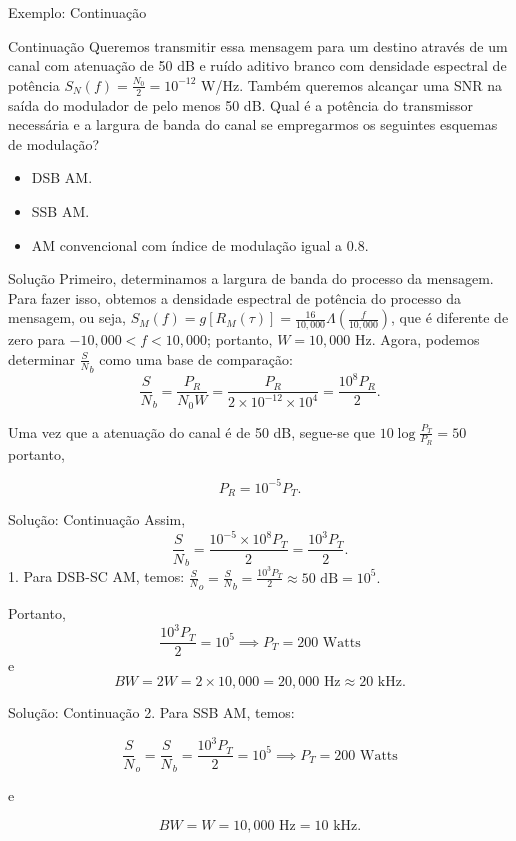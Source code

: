 \documentclass[aspectratio=169,dvipsnames]{beamer}
\begin{document}
\begin{frame}{Exemplo: Continuação}
\begin{block}{Continuação}
        Queremos transmitir essa mensagem para um destino através de um canal com atenuação de 50 dB e ruído aditivo branco com densidade espectral de potência \( S_N(f) = \frac{N_0}{2} = 10^{-12} \) W/Hz. Também queremos alcançar uma SNR na saída do modulador de pelo menos 50 dB. Qual é a potência do transmissor necessária e a largura de banda do canal se empregarmos os seguintes esquemas de modulação?

        \begin{itemize}
    \item DSB AM.
    \item SSB AM.
    \item AM convencional com índice de modulação igual a 0.8.
\end{itemize}

\end{block}

\end{frame}

\begin{frame}{Solução}
Primeiro, determinamos a largura de banda do processo da mensagem. Para fazer isso, obtemos a densidade espectral de potência do processo da mensagem, ou seja, $S_M(f) = g[R_M(\tau)] = \frac{16}{10,000} \Lambda \left( \frac{f}{10,000} \right)$, que é diferente de zero para \( -10,000 < f < 10,000 \); portanto, \( W = 10,000 \) Hz. Agora, podemos determinar \( \frac{S}{N}_b \) como uma base de comparação:
\[
\frac{S}{N}_b = \frac{P_R}{N_0W} = \frac{P_R}{2 \times 10^{-12} \times 10^4} = \frac{10^8 P_R}{2}.
\]

Uma vez que a atenuação do canal é de 50 dB, segue-se que $10 \log \frac{P_T}{P_R} = 50$
portanto,

\[
P_R = 10^{-5} P_T.
\]
\end{frame}

\begin{frame}{Solução: Continuação}
Assim,
\[
\frac{S}{N}_b = \frac{10^{-5} \times 10^8 P_T}{2} = \frac{10^3 P_T}{2}.
\]
1. Para DSB-SC AM, temos: $\frac{S}{N}_o = \frac{S}{N}_b = \frac{10^3 P_T}{2} \approx 50 \text{ dB} = 10^5.$

Portanto,
\[
\frac{10^3 P_T}{2} = 10^5 \implies P_T = 200 \text{ Watts}
\]
e
\[
BW = 2W = 2 \times 10,000 = 20,000 \text{ Hz} \approx 20 \text{ kHz}.
\]
\end{frame}

\begin{frame}{Solução: Continuação}
    2. Para SSB AM, temos:

\[
\frac{S}{N}_o = \frac{S}{N}_b = \frac{10^3 P_T}{2} = 10^5 \implies P_T = 200 \text{ Watts}
\]

e

\[
BW = W = 10,000 \text{ Hz} = 10 \text{ kHz}.
\]

\end{frame}
\end{document}

